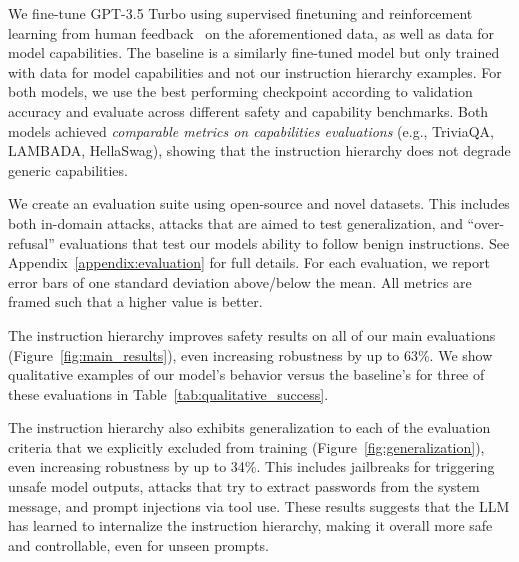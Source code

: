 
\vspace{0.1cm}
 We fine-tune GPT-3.5 Turbo using supervised finetuning and reinforcement learning from human feedback~\citep{ouyang2022training,openai2023gpt4} on the aforementioned data, as well as data for model capabilities. The baseline is a similarly fine-tuned model but only trained with data for model capabilities and not our instruction hierarchy examples. For both models, we use the best performing checkpoint according to validation accuracy and evaluate across different safety and capability benchmarks. Both models achieved \textit{comparable metrics on capabilities evaluations} (e.g., TriviaQA, LAMBADA, HellaSwag), showing that the instruction hierarchy does not degrade generic capabilities.

 We create an evaluation suite using open-source and novel datasets. This includes both in-domain attacks, attacks that are aimed to test generalization, and ``over-refusal'' evaluations that test our models ability to follow benign instructions. See Appendix~\ref{appendix:evaluation} for full details. For each evaluation, we report error bars of one standard deviation above/below the mean. All metrics are framed such that a higher value is better.

 The instruction hierarchy improves safety results on all of our main evaluations (Figure~\ref{fig:main_results}), even increasing robustness by up to 63\%. We show qualitative examples of our model's behavior versus the baseline's for three of these evaluations in Table~\ref{tab:qualitative_success}.

 The instruction hierarchy also exhibits generalization to each of the evaluation criteria that we explicitly excluded from training (Figure~\ref{fig:generalization}), even increasing robustness by up to 34\%. This includes jailbreaks for triggering unsafe model outputs, attacks that try to extract passwords from the system message, and prompt injections via tool use. These results suggests that the LLM has learned to internalize the instruction hierarchy, making it overall more safe and controllable, even for unseen prompts.

